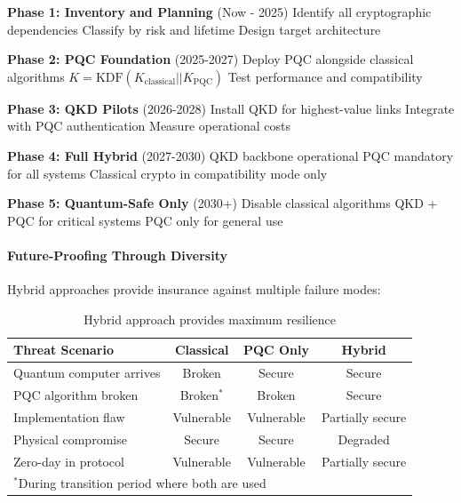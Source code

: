 \documentclass[11pt,a4paper]{article}
\begin{document}
\begin{algorithm}
\caption{Phased Hybrid Migration}
\begin{algorithmic}[1]
\State \textbf{Phase 1: Inventory and Planning} (Now - 2025)
\State \quad Identify all cryptographic dependencies
\State \quad Classify by risk and lifetime
\State \quad Design target architecture

\State \textbf{Phase 2: PQC Foundation} (2025-2027)
\State \quad Deploy PQC alongside classical algorithms
\State \quad $K = \text{KDF}(K_{\text{classical}} || K_{\text{PQC}})$
\State \quad Test performance and compatibility

\State \textbf{Phase 3: QKD Pilots} (2026-2028)
\State \quad Install QKD for highest-value links
\State \quad Integrate with PQC authentication
\State \quad Measure operational costs

\State \textbf{Phase 4: Full Hybrid} (2027-2030)
\State \quad QKD backbone operational
\State \quad PQC mandatory for all systems
\State \quad Classical crypto in compatibility mode only

\State \textbf{Phase 5: Quantum-Safe Only} (2030+)
\State \quad Disable classical algorithms
\State \quad QKD + PQC for critical systems
\State \quad PQC only for general use
\end{algorithmic}
\end{algorithm}

\paragraph{Future-Proofing Through Diversity}

Hybrid approaches provide insurance against multiple failure modes:

\begin{table}[h]
\centering
\begin{tabular}{|l|c|c|c|}
\hline
\textbf{Threat Scenario} & \textbf{Classical} & \textbf{PQC Only} & \textbf{Hybrid} \\
\hline
Quantum computer arrives & Broken & Secure & Secure \\
PQC algorithm broken & Broken$^*$ & Broken & Secure \\
Implementation flaw & Vulnerable & Vulnerable & Partially secure \\
Physical compromise & Secure & Secure & Degraded \\
Zero-day in protocol & Vulnerable & Vulnerable & Partially secure \\
\hline
\multicolumn{4}{l}{$^*$During transition period where both are used}
\end{tabular}
\caption{Hybrid approach provides maximum resilience}
\end{table}
\end{document}

